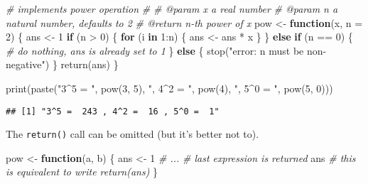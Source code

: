 \documentclass[
  oneside]{book}
\newenvironment{Shaded}{\begin{snugshade}}{\end{snugshade}}
\newcommand{\AttributeTok}[1]{\textcolor[rgb]{0.77,0.63,0.00}{#1}}
\newcommand{\CommentTok}[1]{\textcolor[rgb]{0.56,0.35,0.01}{\textit{#1}}}
\newcommand{\ControlFlowTok}[1]{\textcolor[rgb]{0.13,0.29,0.53}{\textbf{#1}}}
\newcommand{\DecValTok}[1]{\textcolor[rgb]{0.00,0.00,0.81}{#1}}
\newcommand{\FunctionTok}[1]{\textcolor[rgb]{0.00,0.00,0.00}{#1}}
\newcommand{\NormalTok}[1]{#1}
\newcommand{\OtherTok}[1]{\textcolor[rgb]{0.56,0.35,0.01}{#1}}
\newcommand{\SpecialCharTok}[1]{\textcolor[rgb]{0.00,0.00,0.00}{#1}}
\newcommand{\StringTok}[1]{\textcolor[rgb]{0.31,0.60,0.02}{#1}}
\begin{document}
\begin{Shaded}
\begin{Highlighting}[]
\CommentTok{\# implements power operation}
\CommentTok{\#\textquotesingle{}}
\CommentTok{\#\textquotesingle{} @param x a real number}
\CommentTok{\#\textquotesingle{} @param n a natural number, defaults to 2}
\CommentTok{\#\textquotesingle{} @return n{-}th power of x}
\NormalTok{pow }\OtherTok{\textless{}{-}} \ControlFlowTok{function}\NormalTok{(x, }\AttributeTok{n =} \DecValTok{2}\NormalTok{) \{}
\NormalTok{  ans }\OtherTok{\textless{}{-}} \DecValTok{1}
  \ControlFlowTok{if}\NormalTok{ (n }\SpecialCharTok{\textgreater{}} \DecValTok{0}\NormalTok{) \{}
    \ControlFlowTok{for}\NormalTok{ (i }\ControlFlowTok{in} \DecValTok{1}\SpecialCharTok{:}\NormalTok{n) \{}
\NormalTok{      ans }\OtherTok{\textless{}{-}}\NormalTok{ ans }\SpecialCharTok{*}\NormalTok{ x}
\NormalTok{    \}}
\NormalTok{  \} }\ControlFlowTok{else} \ControlFlowTok{if}\NormalTok{ (n }\SpecialCharTok{==} \DecValTok{0}\NormalTok{) \{}
    \CommentTok{\# do nothing, ans is already set to 1}
\NormalTok{  \} }\ControlFlowTok{else}\NormalTok{ \{}
    \FunctionTok{stop}\NormalTok{(}\StringTok{"error: n must be non{-}negative"}\NormalTok{)}
\NormalTok{  \}}
  \FunctionTok{return}\NormalTok{(ans)}
\NormalTok{\}}

\FunctionTok{print}\NormalTok{(}\FunctionTok{paste}\NormalTok{(}\StringTok{"3\^{}5 = "}\NormalTok{, }\FunctionTok{pow}\NormalTok{(}\DecValTok{3}\NormalTok{, }\DecValTok{5}\NormalTok{),}
            \StringTok{", 4\^{}2 = "}\NormalTok{, }\FunctionTok{pow}\NormalTok{(}\DecValTok{4}\NormalTok{),}
            \StringTok{", 5\^{}0 = "}\NormalTok{, }\FunctionTok{pow}\NormalTok{(}\DecValTok{5}\NormalTok{, }\DecValTok{0}\NormalTok{)))}
\end{Highlighting}
\end{Shaded}

\begin{verbatim}
## [1] "3^5 =  243 , 4^2 =  16 , 5^0 =  1"
\end{verbatim}

The \texttt{return()} call can be omitted (but it's better not to).

\begin{Shaded}
\begin{Highlighting}[]
\NormalTok{pow }\OtherTok{\textless{}{-}} \ControlFlowTok{function}\NormalTok{(a, b) \{}
\NormalTok{  ans }\OtherTok{\textless{}{-}} \DecValTok{1}
  \CommentTok{\# ...}
  \CommentTok{\# last expression is returned}
\NormalTok{  ans }\CommentTok{\# this is equivalent to write return(ans)}
\NormalTok{\}}
\end{Highlighting}
\end{Shaded}
\end{document}
